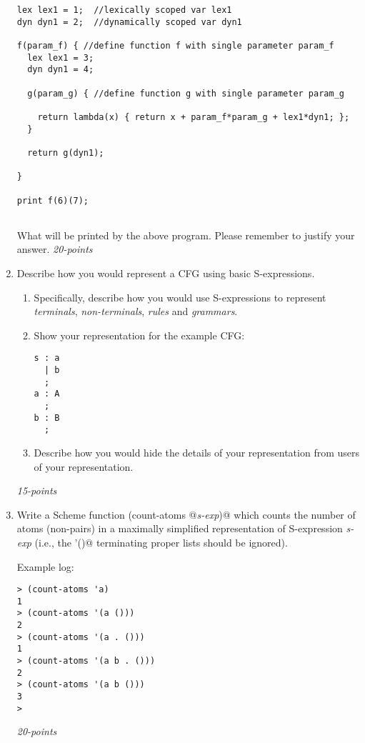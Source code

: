 \documentclass[12pt]{article}
\begin{document}
\begin{enumerate}
\begin{verbatim}
lex lex1 = 1;  //lexically scoped var lex1
dyn dyn1 = 2;  //dynamically scoped var dyn1

f(param_f) { //define function f with single parameter param_f
  lex lex1 = 3; 
  dyn dyn1 = 4;

  g(param_g) { //define function g with single parameter param_g

    return lambda(x) { return x + param_f*param_g + lex1*dyn1; };
  }

  return g(dyn1);

}

print f(6)(7);
  
\end{verbatim}


What will be printed by the above program.  Please remember to justify
your answer.  \hfill\textit{20-points}

\item Describe how you would represent a CFG using basic
  S-expressions.

\begin{enumerate}  
  \item Specifically, describe how you would use
  S-expressions to represent \textit{terminals},
  \textit{non-terminals}, \textit{rules} and \textit{grammars}.

  \item Show your representation for the example CFG:
\begin{verbatim}
s : a
  | b
  ;
a : A
  ;
b : B
  ;
\end{verbatim}

  \item Describe how you would hide the details of your representation from
    users of your representation.

\end{enumerate}
\hfill\textit{15-points}

\item Write a Scheme function
  \verb@(count-atoms @\textit{s-exp}\verb@)@ which counts the number
  of atoms (non-pairs) in a maximally simplified representation of
  S-expression \textit{s-exp} (i.e., the \verb@'()@ terminating proper
  lists should be ignored).

Example log:
\begin{verbatim}
> (count-atoms 'a)
1
> (count-atoms '(a ()))
2
> (count-atoms '(a . ()))
1
> (count-atoms '(a b . ()))
2
> (count-atoms '(a b ()))
3
>
\end{verbatim}  \hfill\textit{20-points}


\end{enumerate}
\end{document}
